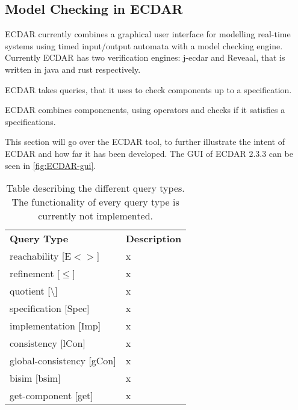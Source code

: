 \subsection{Model Checking in ECDAR}
ECDAR currently combines a graphical user interface for modelling real-time systems using timed input/output automata with a model checking engine. Currently ECDAR has two verification engines: j-ecdar and Reveaal, that is written in java and rust respectively.

ECDAR takes queries, that it uses to check components up to a specification. 

ECDAR combines componenents, using operators and checks if it satisfies a specifications.




This section will go over the ECDAR tool, to further illustrate the intent of ECDAR and how far it has been developed. The GUI of ECDAR 2.3.3 can be seen in \autoref{fig:ECDAR-gui}.

\begin{table}[H]
\begin{tabular}{ll}
\textbf{Query Type} & \textbf{Description} \\
reachability [E$<>$]     & x                    \\
refinement [$\leq$]      & x                    \\
quotient [\textbackslash]& x                    \\
specification [Spec]     & x                    \\
implementation [Imp]     & x                    \\
consistency [lCon]       & x                    \\
global-consistency [gCon]& x                    \\
bisim [bsim]             & x                    \\
get-component [get]      & x                    \\
\end{tabular}
\caption{\label{tab:querytypes}Table describing the different query types. The functionality of every query type is currently not implemented.}
\end{table}